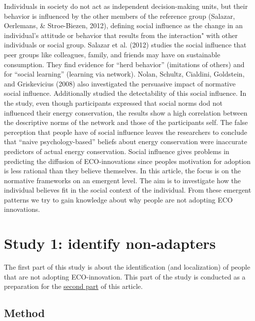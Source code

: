 \documentclass[man,floatsintext]{apa6}
\begin{document}
Individuals in society do not act as independent decision-making units,
but their behavior is influenced by the other members of the reference
group (Salazar, Oerlemans, \& Stroe-Biezen, 2012), defining social
influence as the change in an individual's attitude or behavior that
results from the interaction" with other individuals or social group.
Salazar et al. (2012) studies the social influence that peer groups like
colleagues, family, and friends may have on sustainable consumption.
They find evidence for \enquote{herd behavior} (imitations of others)
and for \enquote{social learning} (learning via network). Nolan,
Schultz, Cialdini, Goldstein, and Griskevicius (2008) also investigated
the persuasive impact of normative social influence. Additionally
studied the detectability of this social influence. In the study, even
though participants expressed that social norms dod not influenced their
energy conservation, the results show a high correlation between the
descriptive norms of the network and those of the participants self. The
false perception that people have of social influence leaves the
researchers to conclude that \enquote{naive psychology-based} beliefs
about energy conservation were inaccurate predictors of actual energy
conservation. Social influence gives problems in predicting the
diffusion of ECO-innovations since peoples motivation for adoption is
less rational than they believe themselves. In this article, the focus
is on the normative frameworks on an emergent level. The aim is to
investigate how the individual believes fit in the social context of the
individual. From these emergent patterns we try to gain knowledge about
why people are not adopting ECO innovations.

\section{\texorpdfstring{Study 1: identify non-adapters
\label{Study1}}{Study 1: identify non-adapters }}\label{study-1-identify-non-adapters}

The first part of this study is about the identification (and
localization) of people that are not adopting ECO-innovation. This part
of the study is conducted as a preparation for the
\hyperref[Study2]{second part} of this article.

\subsection{Method}\label{method}
\end{document}
